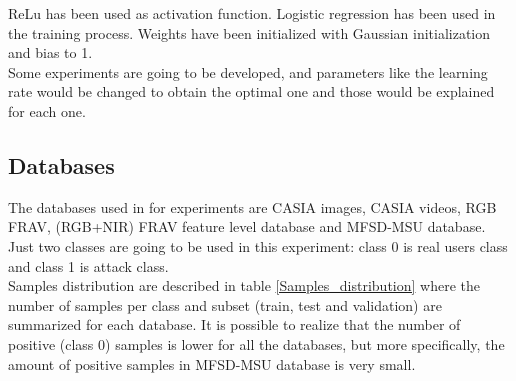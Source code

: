 ReLu has been used as activation function. Logistic regression has been used in the training process. Weights have been initialized with Gaussian initialization and bias to 1.\\

Some experiments are going to be developed, and parameters like the learning rate would be changed to obtain the optimal one and those would be explained for each one.\\

\subsection{Databases} \label{subssec:ejec1_database}
The databases used in for experiments are CASIA images, CASIA videos, RGB FRAV, (RGB+NIR) FRAV feature level database and MFSD-MSU database. Just two classes are going to be used in this experiment: class 0 is real users class and class 1 is attack class.\\

Samples distribution are described in table \ref{Samples_distribution} where the number of samples per class and  subset (train, test and validation) are summarized for each database. It is possible to realize that the number of positive (class 0) samples is lower for all the databases, but more specifically, the amount of positive samples in MFSD-MSU database is very small.\\

